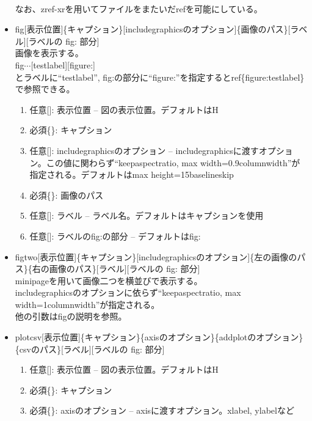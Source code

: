 \documentclass[uplatex, a4paper, dvipdfmx, 12pt]{jsreport}
\begin{document}
\begin{itemize}
				\\
				なお、zref-xrを用いてファイルをまたいだrefを可能にしている。
		\item \tbs fig[表示位置]\{キャプション\}[includegraphicsのオプション]\{画像のパス\}[ラベル][ラベルの fig: 部分]\\
				画像を表示する。\\
				\tbs fig$\cdots$[testlabel][figure:]\\
				とラベルに``testlabel'', fig:の部分に``figure:''を指定すると\tbs ref\{figure:testlabel\}で参照できる。
				\begin{enumerate}
					\item 任意[]: 表示位置 -- 図の表示位置。デフォルトはH
					\item 必須\{\}: キャプション
					\item 任意[]: includegraphicsのオプション -- includegraphicsに渡すオプション。この値に関わらず``keepaspectratio, max width=0.9\tbs columnwidth''が指定される。デフォルトはmax height=15\tbs baselineskip
					\item 必須\{\}: 画像のパス
					\item 任意[]: ラベル -- ラベル名。デフォルトはキャプションを使用
					\item 任意[]: ラベルのfig:の部分 -- デフォルトはfig:
				\end{enumerate}
		\item \tbs figtwo[表示位置]\{キャプション\}[includegraphicsのオプション]\{左の画像のパス\}\{右の画像のパス\}[ラベル][ラベルの fig: 部分]\\
				minipageを用いて画像二つを横並びで表示する。\\
				includegraphicsのオプションに依らず``keepaspectratio, max width=1\tbs columnwidth''が指定される。\\
				他の引数は\tbs figの説明を参照。
		\item \tbs plotcsv[表示位置]\{キャプション\}\{axisのオプション\}\{addplotのオプション\}\{csvのパス\}[ラベル][ラベルの fig: 部分]\\
				\begin{enumerate}
					\item 任意[]: 表示位置 -- 図の表示位置。デフォルトはH
					\item 必須\{\}: キャプション
					\item 必須\{\}: axisのオプション -- axisに渡すオプション。xlabel, ylabelなど

\end{enumerate}
\end{itemize}
\end{document}

